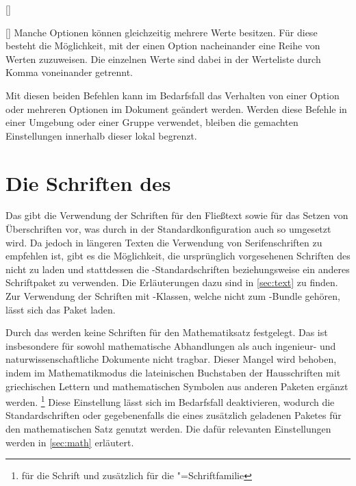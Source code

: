 \begin{Declaration*}{}
\begin{Declaration*}{}
\begin{Declaration*}{}
\begin{Declaration}{[]}
\begin{Declaration}{[]}
Manche Optionen können gleichzeitig mehrere Werte besitzen. Für diese besteht 
die Möglichkeit, mit  der einen Option nacheinander eine 
Reihe von Werten zuzuweisen. Die einzelnen Werte sind dabei in der Werteliste 
durch Komma voneinander getrennt.

Mit diesen beiden Befehlen kann im Bedarfsfall das Verhalten von einer Option 
oder mehreren Optionen im Dokument geändert werden. Werden diese Befehle in 
einer Umgebung oder einer Gruppe verwendet, bleiben die gemachten Einstellungen 
innerhalb dieser lokal begrenzt.
\end{Declaration}
\end{Declaration}



\section{Die Schriften des \CDs}
%
%
%
%
Das \TUDCD gibt die Verwendung der Schriften \Univers für den Fließtext 
sowie \DIN für das Setzen von Überschriften vor, was durch \TUDScript in der 
Standardkonfiguration auch so umgesetzt wird. Da jedoch in längeren Texten die 
Verwendung von Serifenschriften zu empfehlen ist, gibt es die Möglichkeit, die 
ursprünglich vorgesehenen Schriften des \CDs nicht zu laden und stattdessen die 
-Standardschriften beziehungsweise ein anderes Schriftpaket zu 
verwenden. Die Erläuterungen dazu sind in \autoref{sec:text} zu finden. Zur 
Verwendung der Schriften mit -Klassen, welche nicht zum 
\TUDScript-Bundle gehören, lässt sich das Paket  laden.


Durch das \CD werden keine Schriften für den Mathematiksatz festgelegt. Das ist 
insbesondere für sowohl mathematische Abhandlungen als auch ingenieur- und 
naturwissenschaftliche Dokumente nicht tragbar. Dieser Mangel wird behoben, 
indem im Mathematikmodus die lateinischen Buchstaben der Hausschriften mit 
griechischen Lettern und mathematischen Symbolen aus anderen Paketen ergänzt 
werden.%
\footnote{%
   für die Schrift \DIN und zusätzlich  für 
  die \Univers"=Schriftfamilie%
}
Diese Einstellung lässt sich im Bedarfsfall deaktivieren, wodurch die 
Standardschriften oder gegebenenfalls die eines zusätzlich geladenen Paketes 
für den mathematischen Satz genutzt werden. Die dafür relevanten Einstellungen 
werden in \autoref{sec:math} erläutert. 



\end{Declaration*}
\end{Declaration*}
\end{Declaration*}
